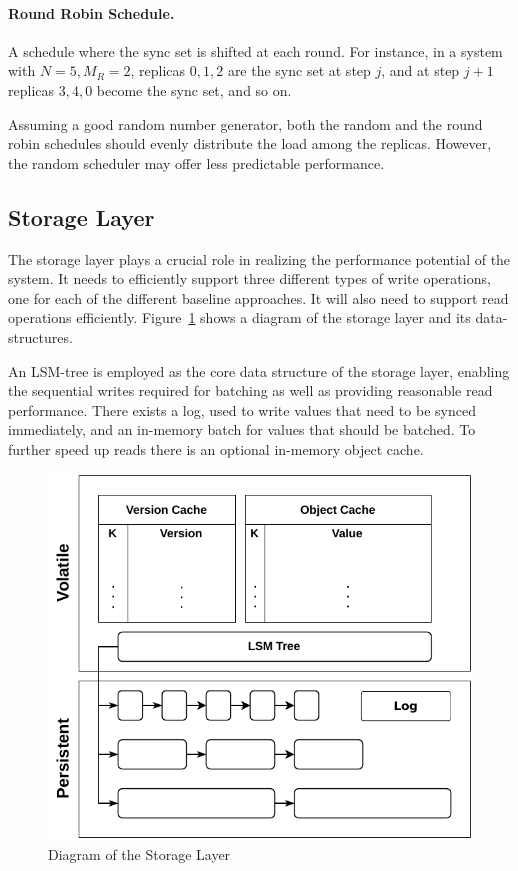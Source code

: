 \paragraph{Round Robin Schedule.} A schedule where the sync set
is shifted at each round. For instance, in a system with $N = 5,
M_R = 2$, replicas $0, 1, 2$ are the sync set at step $j$, and
at step $j + 1$ replicas $3, 4, 0$ become the sync set, and so
on.


Assuming a good random number generator, both the random and the
round robin schedules should evenly distribute the load among the
replicas. However, the random scheduler may offer less
predictable performance.

\subsection{Storage Layer}\label{ssec:storage}

The storage layer plays a crucial role in realizing the
performance potential of the system. It needs to efficiently support
three different types of write operations, one for each of the
different baseline approaches. It will also need to support read operations
efficiently. Figure~\ref{fig:storage_layer} shows a diagram of
the storage layer and its data-structures.

An \ac{LSM-tree} is employed as the core data structure of the storage
layer, enabling the sequential writes required for batching as
well as providing reasonable read performance. There exists a
log, used to write values that need to be synced immediately, and
an in-memory batch for values that should be batched. To further speed
up reads there is an optional in-memory object cache.

\begin{figure}[t]
    \centering
    \includegraphics[width=.75\linewidth]{img/storage_layer}
    \caption{Diagram of the Storage Layer}\label{fig:storage_layer}
\end{figure}


